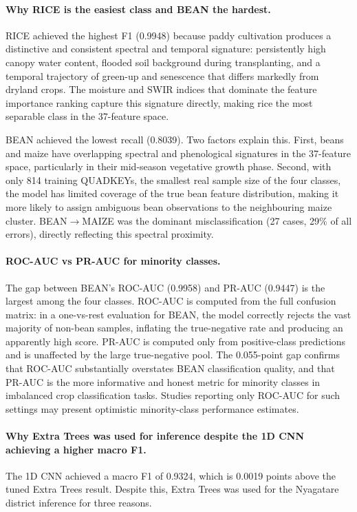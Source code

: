 \paragraph{Why RICE is the easiest class and BEAN the hardest.}
RICE achieved the highest F1 (0.9948) because paddy cultivation
produces a distinctive and consistent spectral and temporal
signature: persistently high canopy water content, flooded soil
background during transplanting, and a temporal trajectory of
green-up and senescence that differs markedly from dryland crops.
The moisture and SWIR indices that dominate the feature importance
ranking capture this signature directly, making rice the most
separable class in the 37-feature space.

BEAN achieved the lowest recall (0.8039). Two factors explain this.
First, beans and maize have overlapping spectral and phenological
signatures in the 37-feature space, particularly in their
mid-season vegetative growth phase. Second, with only 814 training
QUADKEYs, the smallest real sample size of the four classes,
the model has limited coverage of the true bean feature
distribution, making it more likely to assign ambiguous bean
observations to the neighbouring maize cluster.
BEAN$\rightarrow$MAIZE was the dominant misclassification (27 cases,
29\% of all errors), directly reflecting this spectral proximity.

\paragraph{ROC-AUC vs PR-AUC for minority classes.}
The gap between BEAN's ROC-AUC (0.9958) and PR-AUC (0.9447) is
the largest among the four classes. ROC-AUC is computed from the
full confusion matrix: in a one-vs-rest evaluation for BEAN, the
model correctly rejects the vast majority of non-bean samples,
inflating the true-negative rate and producing an apparently high
score. PR-AUC is computed only from positive-class predictions and
is unaffected by the large true-negative pool. The 0.055-point gap
confirms that ROC-AUC substantially overstates BEAN classification
quality, and that PR-AUC is the more informative and honest metric
for minority classes in imbalanced crop classification tasks.
Studies reporting only ROC-AUC for such settings may present
optimistic minority-class performance estimates.

\paragraph{Why Extra Trees was used for inference despite the 1D
CNN achieving a higher macro F1.}
The 1D CNN achieved a macro F1 of 0.9324, which is 0.0019 points
above the tuned Extra Trees result. Despite this, Extra Trees was
used for the Nyagatare district inference for three reasons.


